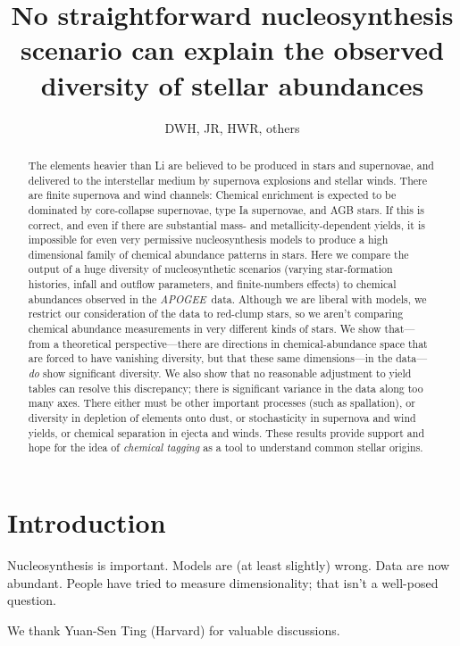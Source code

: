 \documentclass[12pt, preprint]{aastex}
\newcommand{\acronym}[1]{{\small{#1}}}
\newcommand{\project}[1]{\textsl{#1}}
\newcommand{\apogee}{\project{\acronym{APOGEE}}}
\begin{document}
\title{No straightforward nucleosynthesis scenario can explain the
  observed diversity of stellar abundances}
\author{DWH, JR, HWR, others}

\begin{abstract}
The elements heavier than Li are believed to be produced in stars and
supernovae, and delivered to the interstellar medium by supernova
explosions and stellar winds.
There are finite supernova and wind channels: Chemical enrichment is
expected to be dominated by core-collapse supernovae, type Ia
supernovae, and AGB stars.
If this is correct, and even if there are substantial mass- and
metallicity-dependent yields, it is impossible for even very
permissive nucleosynthesis models to produce a high dimensional family
of chemical abundance patterns in stars.
Here we compare the output of a huge diversity of nucleosynthetic
scenarios (varying star-formation histories, infall and outflow
parameters, and finite-numbers effects) to chemical abundances
observed in the \apogee\ data.
Although we are liberal with models, we restrict our consideration of
the data to red-clump stars, so we aren't comparing chemical abundance
measurements in very different kinds of stars.
We show that---from a theoretical perspective---there are directions
in chemical-abundance space that are forced to have vanishing
diversity, but that these same dimensions---in the data---\emph{do}
show significant diversity.
We also show that no reasonable adjustment to yield tables can resolve
this discrepancy; there is significant variance in the data along too
many axes.
There either must be other important processes (such as spallation), or
diversity in depletion of elements onto dust, or stochasticity in
supernova and wind yields, or chemical separation in ejecta and winds.
These results provide support and hope for the idea of \emph{chemical
tagging} as a tool to understand common stellar origins.
\end{abstract}


\section{Introduction}

Nucleosynthesis is important.  Models are (at least slightly) wrong.
Data are now abundant. People have tried to measure dimensionality; that
isn't a well-posed question.

\acknowledgements
We thank Yuan-Sen Ting (Harvard) for valuable discussions.
\end{document}
